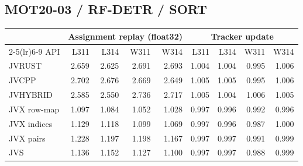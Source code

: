 \subsection*{MOT20-03 / RF-DETR / SORT}
\begin{center}\small
\begin{tabular}{@{}lrrrrrrrr@{}}
\toprule
 & \multicolumn{4}{c}{Assignment replay (float32)} & \multicolumn{4}{c}{Tracker update} \\
\cmidrule(lr){2-5}\cmidrule(lr){6-9}
API & L311 & L314 & W311 & W314 & L311 & L314 & W311 & W314 \\
\midrule
JVRUST & 2.659 & 2.625 & 2.691 & 2.693 & 1.004 & 1.004 & 0.995 & 1.006 \\
JVCPP & 2.702 & 2.676 & 2.669 & 2.649 & 1.005 & 1.005 & 0.995 & 1.006 \\
JVHYBRID & 2.585 & 2.550 & 2.736 & 2.717 & 1.005 & 1.004 & 1.006 & 1.005 \\
JVX row-map & 1.097 & 1.084 & 1.052 & 1.028 & 0.997 & 0.996 & 0.992 & 0.996 \\
JVX indices & 1.129 & 1.118 & 1.099 & 1.069 & 0.997 & 0.996 & 0.987 & 1.000 \\
JVX pairs & 1.228 & 1.197 & 1.198 & 1.167 & 0.997 & 0.997 & 0.991 & 0.999 \\
JVS & 1.136 & 1.152 & 1.127 & 1.100 & 0.997 & 0.997 & 0.988 & 0.999 \\
\bottomrule
\end{tabular}
\end{center}
